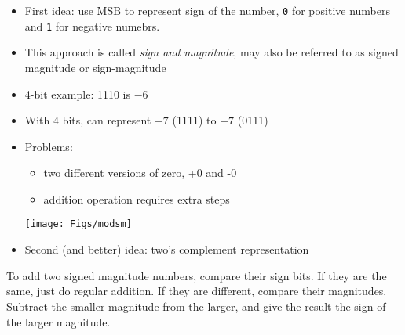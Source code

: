 \begin{frame}[fragile]
\begin{itemize}
\item First idea: use MSB to represent sign of the number, \texttt{0} for  positive numbers and \texttt{1} for negative numebrs. 
\item This approach is called \textit{sign and magnitude}, {\small may also be referred to as signed magnitude or sign-magnitude}
\item 4-bit example: 1110 is $-6$
\item With 4 bits, can represent $-7$ (1111) to $+7$ (0111)
\item Problems: 
\begin{multicols}{2}
\begin{itemize}
    \item two different versions of zero, +0 and -0
    \item addition operation requires extra steps
\end{itemize}
\columnbreak
\begin{center}
\texttt{[image: Figs/modsm]}    
\end{center}
    
\end{multicols}

\item Second (and better) idea: two's complement representation
\end{itemize}
\BNotes\ifnum{}
To add two signed magnitude numbers, compare their sign bits. If they
are the same, just do regular addition. If they are different, compare
their magnitudes. Subtract the smaller magnitude from the larger, and
give the result the sign of the larger magnitude.
\fi\ENotes
\end{frame}

